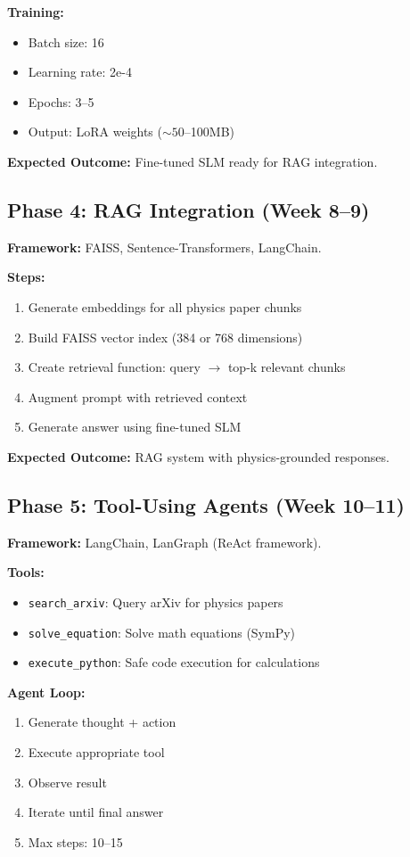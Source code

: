 \documentclass[11pt]{article}
\begin{document}
\textbf{Training:}
\begin{itemize}[leftmargin=1.2em]
  \item Batch size: 16
  \item Learning rate: 2e-4
  \item Epochs: 3--5
  \item Output: LoRA weights ($\sim 50$--100MB)
\end{itemize}

\textbf{Expected Outcome:} Fine-tuned SLM ready for RAG integration.

\subsection{Phase 4: RAG Integration (Week 8--9)}

\textbf{Framework:} FAISS, Sentence-Transformers, LangChain.

\textbf{Steps:}
\begin{enumerate}[leftmargin=1.5em]
  \item Generate embeddings for all physics paper chunks
  \item Build FAISS vector index (384 or 768 dimensions)
  \item Create retrieval function: query $\rightarrow$ top-k relevant chunks
  \item Augment prompt with retrieved context
  \item Generate answer using fine-tuned SLM
\end{enumerate}

\textbf{Expected Outcome:} RAG system with physics-grounded responses.

\subsection{Phase 5: Tool-Using Agents (Week 10--11)}

\textbf{Framework:} LangChain, LanGraph (ReAct framework).

\textbf{Tools:}
\begin{itemize}[leftmargin=1.2em]
  \item \texttt{search\_arxiv}: Query arXiv for physics papers
  \item \texttt{solve\_equation}: Solve math equations (SymPy)
  \item \texttt{execute\_python}: Safe code execution for calculations
\end{itemize}

\textbf{Agent Loop:}
\begin{enumerate}[leftmargin=1.5em]
  \item Generate thought + action
  \item Execute appropriate tool
  \item Observe result
  \item Iterate until final answer
  \item Max steps: 10--15
\end{enumerate}
\end{document}
